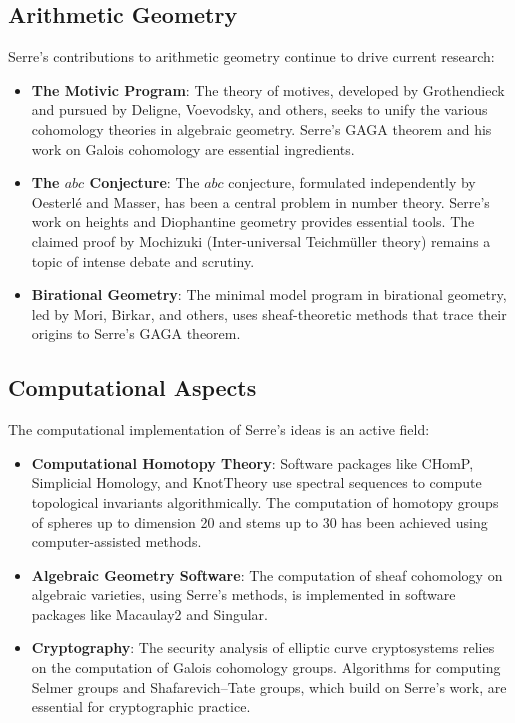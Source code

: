 \subsection{Arithmetic Geometry}

Serre's contributions to arithmetic geometry continue to drive current research:

\begin{itemize}
\item \textbf{The Motivic Program}: The theory of motives, developed by Grothendieck and pursued by Deligne, Voevodsky, and others, seeks to unify the various cohomology theories in algebraic geometry. Serre's GAGA theorem and his work on Galois cohomology are essential ingredients.

\item \textbf{The $abc$ Conjecture}: The $abc$ conjecture, formulated independently by Oesterlé and Masser, has been a central problem in number theory. Serre's work on heights and Diophantine geometry provides essential tools. The claimed proof by Mochizuki (Inter-universal Teichmüller theory) remains a topic of intense debate and scrutiny.

\item \textbf{Birational Geometry}: The minimal model program in birational geometry, led by Mori, Birkar, and others, uses sheaf-theoretic methods that trace their origins to Serre's GAGA theorem.
\end{itemize}

\subsection{Computational Aspects}

The computational implementation of Serre's ideas is an active field:

\begin{itemize}
\item \textbf{Computational Homotopy Theory}: Software packages like CHomP, Simplicial Homology, and KnotTheory use spectral sequences to compute topological invariants algorithmically. The computation of homotopy groups of spheres up to dimension 20 and stems up to 30 has been achieved using computer-assisted methods.

\item \textbf{Algebraic Geometry Software}: The computation of sheaf cohomology on algebraic varieties, using Serre's methods, is implemented in software packages like Macaulay2 and Singular.

\item \textbf{Cryptography}: The security analysis of elliptic curve cryptosystems relies on the computation of Galois cohomology groups. Algorithms for computing Selmer groups and Shafarevich--Tate groups, which build on Serre's work, are essential for cryptographic practice.
\end{itemize}

